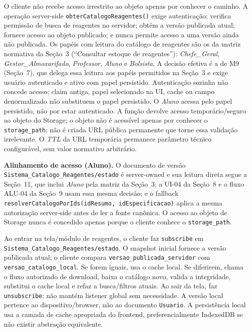 \begin{regra}
O cliente não recebe acesso irrestrito ao objeto apenas por conhecer o caminho. A operação server-side \texttt{obterCatalogoReagentes()} exige autenticação; verifica permissão de busca de reagentes no servidor; obtém a versão publicada atual; fornece acesso ao objeto publicado; e nunca permite acesso a uma versão ainda não publicada. Os papéis com leitura do catálogo de reagentes são os da matriz normativa da Seção~3 (``Consultar estoque de reagentes''): \textit{Chefe\_Geral}, \textit{Gestor\_Almoxarifado}, \textit{Professor}, \textit{Aluno} e \textit{Bolsista}. A decisão efetiva é a de M9 (Seção~7), que delega essa leitura aos papéis permitidos na Seção~3 e exige usuário autenticado e ativo com papel persistido. Autenticação sozinha não concede acesso; claim antiga, papel selecionado na UI, cache ou campo denormalizado não substituem o papel persistido. O \textit{Aluno} acessa pelo papel persistido, não por estar autenticado. A função devolve acesso temporário/seguro ao objeto do Storage; o objeto não é acessível apenas por conhecer o \texttt{storage\_path}; não é criada URL pública permanente que torne essa validação irrelevante. O \textit{TTL} da URL temporária permanece parâmetro técnico configurável, sem valor normativo arbitrário.
\end{regra}

\textbf{Alinhamento de acesso (Aluno).} O documento de versão \texttt{Sistema\_Catalogo\_Reagentes/estado} é server-owned e sua leitura direta segue a Seção~11, que inclui \textit{Aluno} pela matriz da Seção~3; a UI-04 da Seção~8 e o fluxo ALU-04 da Seção~9 usam essa mesma decisão; e o fallback \texttt{resolverCatalogoPorIds(idResumo, idEspecificacao)} aplica a mesma autorização server-side antes de ler a fonte canônica. O acesso ao objeto de Storage nunca é concedido apenas porque o cliente conhece o \texttt{storage\_path}.

\begin{regra}
Ao entrar na tela/módulo de reagentes, o cliente faz \texttt{subscribe} em \texttt{Sistema\_Catalogo\_Reagentes/estado}. O snapshot inicial fornece a versão publicada atual; o cliente compara \texttt{versao\_publicada\_servidor} com \texttt{versao\_catalogo\_local}. Se forem iguais, usa o cache local. Se diferirem, chama o fluxo autorizado de download, baixa o catálogo novo, valida a integridade, substitui o cache local e refaz a busca/filtros atuais. Ao sair da tela, faz \texttt{unsubscribe}; não mantém listener global sem necessidade. A versão local pertence ao dispositivo/browser, não ao documento \texttt{Usuario}. A persistência local usa a camada de cache apropriada do frontend, preferencialmente IndexedDB se não existir abstração equivalente.
\end{regra}

